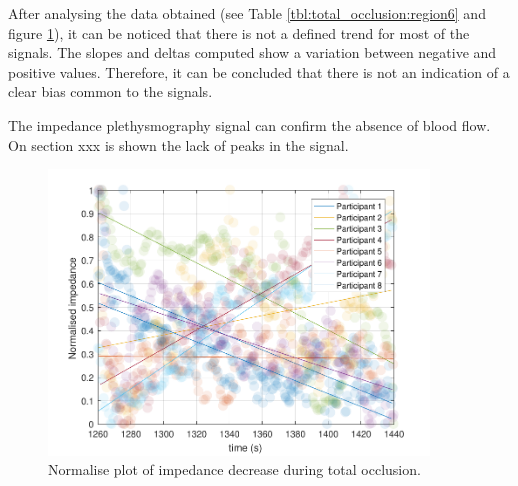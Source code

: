 After analysing the data obtained (see  Table \ref{tbl:total_occlusion:region6} and figure \ref{fig:normalise:total_occlusion}), it can be noticed that there is not a defined trend for most of the signals. The slopes and deltas computed show a variation between negative and positive values. Therefore, it can be concluded that there is not an indication of a clear bias common to the signals. 

The impedance plethysmography signal can confirm the absence of blood flow. On section xxx  is shown the lack of peaks in the signal. 

\begin{figure}
	\centering
	\includegraphics[width=0.9\textwidth,height=0.9\textheight,keepaspectratio]{figure5}    
	\caption{Normalise plot of impedance decrease during total occlusion.}
	\label{fig:normalise:total_occlusion}
\end{figure}
